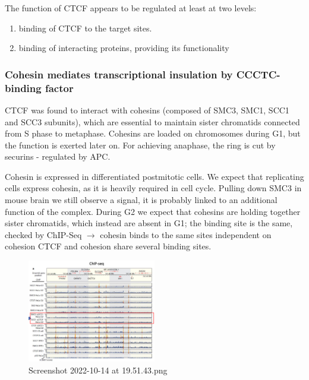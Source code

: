 The function of CTCF appears to be regulated at least at two levels:

\begin{enumerate}
\def\labelenumi{\arabic{enumi}.}
\tightlist
\item
  binding of CTCF to the target sites.
\item
  binding of interacting proteins, providing its functionality
\end{enumerate}

\hypertarget{cohesin-mediates-transcriptional-insulation-by-ccctc-binding-factor}{%
\subsubsection{Cohesin mediates transcriptional insulation by CCCTC-binding factor}\label{cohesin-mediates-transcriptional-insulation-by-ccctc-binding-factor}}

CTCF was found to interact with cohesins (composed of SMC3, SMC1, SCC1 and SCC3 subunits), which are essential to maintain sister chromatids connected from S phase to metaphase. Cohesins are loaded on chromosomes during G1, but the function is exerted later on. For achieving anaphase, the ring is cut by securins - regulated by APC.

Cohesin is expressed in differentiated postmitotic cells. We expect that replicating cells express cohesin, as it is heavily required in cell cycle. Pulling down SMC3 in mouse brain we still observe a signal, it is probably linked to an additional function of the complex. During G2 we expect that cohesins are holding together sister chromatids, which instead are absent in G1; the binding site is the same, checked by ChIP-Seq $\rightarrow$ cohesin binds to the same sites independent on cohesion CTCF and cohesion share several binding sites.

\begin{figure}
\centering
\includegraphics[width=0.5\textwidth]{../_resources/Screenshot_2022-10-14_at_19-51-43.png}
\caption{Screenshot 2022-10-14 at 19.51.43.png}
\end{figure}

